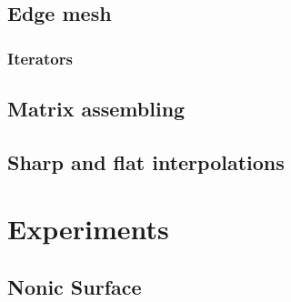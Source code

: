 \documentclass[a4paper,11pt]{scrartcl}
\begin{document}
  \subsection{Edge mesh}

    \subsubsection{Iterators}

  \subsection{Matrix assembling}

  \subsection{Sharp and flat interpolations}


\section{Experiments}

  \subsection{Nonic Surface}
\end{document}
